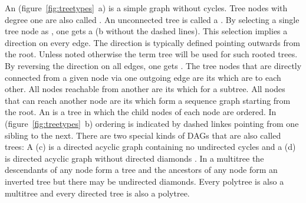 An  (figure~\ref{fig:treetypes}~{\ormbf a}) is a
simple graph without cycles. Tree nodes with degree one are also called
. An unconnected tree is called a . By
selecting a single tree node as , one gets a 
 ({\ormbf b} without the dashed lines). This
selection implies a direction on every edge. The direction is typically defined
pointing outwards from the root. Unless noted otherwise the term tree will be
used for such rooted trees. By reversing the direction on all edges, one gets
. The tree nodes that are directly connected from a
given node via one outgoing edge are its  which are
 to each other. All nodes reachable from another are its
 which for a subtree. All nodes that can reach
another node are its  which form a sequence graph
starting from the root. An  is a tree in which the
child nodes of each node are ordered. In (figure~\ref{fig:treetypes}~{\ormbf b})
ordering is indicated by dashed linkes pointing from one sibling to the next.
There are two special kinds of DAGs that are also called trees: A
 ({\ormbf c}) is a directed acyclic graph containing no
undirected cycles and a  ({\ormbf d}) is directed
acyclic graph without directed diamonds \cite{Furnas1994}. In a multitree the
descendants of any node form a tree and the ancestors of any node form an
inverted tree but there may be undirected diamonds. Every polytree is also a
multitree and every directed tree is also a polytree.
